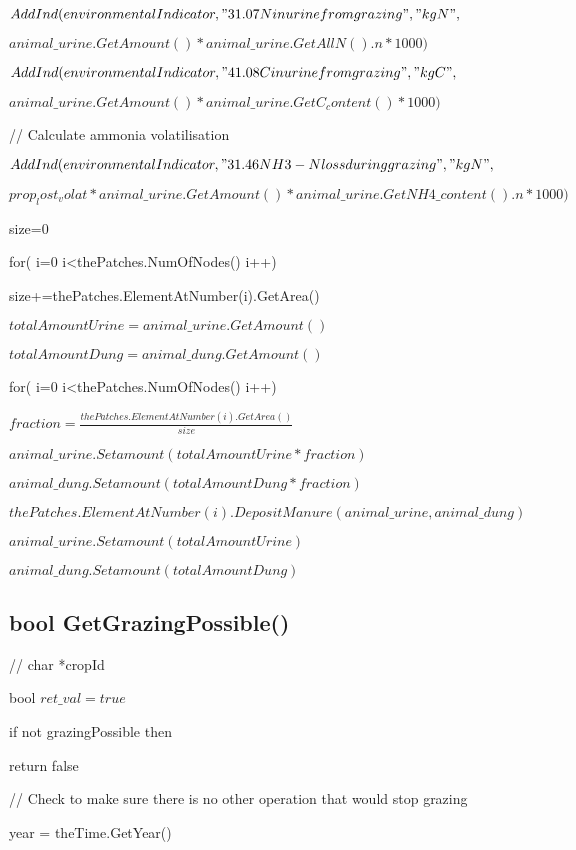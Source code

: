 \documentclass[%
]{scrartcl}
\begin{document}
{{$   AddInd(environmentalIndicator,"31.07 N 
in urine from grazing","kg N",$

$animal\_urine.GetAmount()
*animal\_urine.GetAllN().n *1000)$
  
  $ AddInd(environmentalIndicator,"41.08 C 
in urine from grazing","kg C",$

$animal\_urine.GetAmount()
*animal\_urine.GetC_content() *1000)$
   
      // Calculate ammonia volatilisation
 
  $ AddInd(environmentalIndicator,
"31.46 NH3-N loss during grazing","kg N",$

$prop_lost_volat 
* animal\_urine.GetAmount()
 * animal\_urine.GetNH4\_content().n * 1000)$

   size=0
   
   for( i=0 i<thePatches.NumOfNodes() i++)
   
	\quad    size+=thePatches.ElementAtNumber(i).GetArea()
   
   $totalAmountUrine=animal\_urine.GetAmount()$
   
   $totalAmountDung=animal\_dung.GetAmount()$
   
   for( i=0 i<thePatches.NumOfNodes() i++)
   
   	   \quad  $fraction=\tfrac{thePatches.ElementAtNumber(i).GetArea()}{size}$

\quad    	 $  animal\_urine.Setamount(totalAmountUrine*fraction)$

\quad    	$   animal\_dung.Setamount(totalAmountDung*fraction)$
   	   
   	   \quad $ thePatches.ElementAtNumber(i).DepositManure(
animal\_urine, animal\_dung)$
   
   $animal\_urine.Setamount(totalAmountUrine)$

  $ animal\_dung.Setamount(totalAmountDung)$


\subsection{bool GetGrazingPossible()}
//   char *cropId

   bool $ret\_val=true$


	if not grazingPossible then
	
   	\quad  return false
   	
   // Check to make sure there is no other operation that would stop grazing
   
    year = theTime.GetYear()
    
}}
\end{document}
